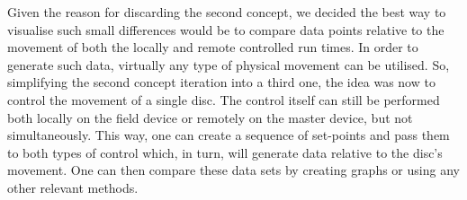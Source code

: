 Given the reason for discarding the second concept, we decided the best way to visualise such small differences would be to compare data points relative to the movement of both the locally and remote controlled run times.
In order to generate such data, virtually any type of physical movement can be utilised.
So, simplifying the second concept iteration into a third one, the idea was now to control the movement of a single disc.
The control itself can still be performed both locally on the field device or remotely on the master device, but not simultaneously.
This way, one can create a sequence of set-points and pass them to both types of control which, in turn, will generate data relative to the disc's movement.
One can then compare these data sets by creating graphs or using any other relevant methods.
